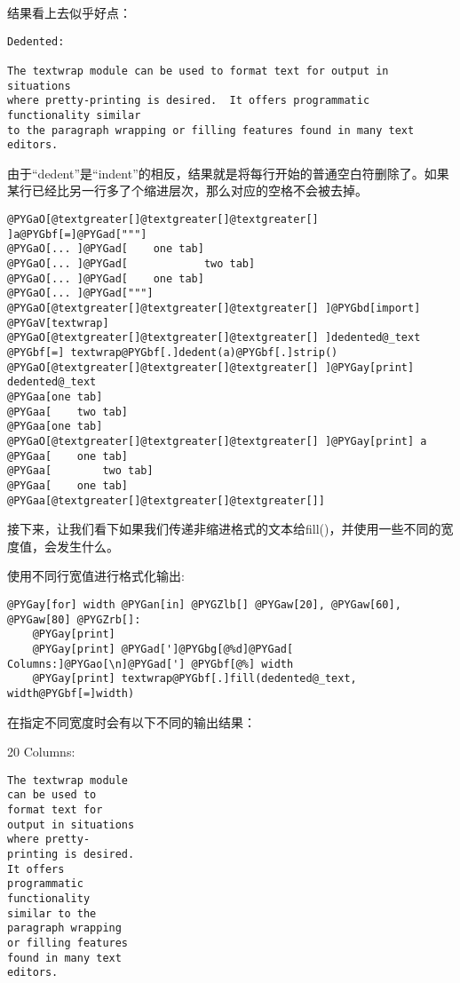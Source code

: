 \documentclass[letterpaper,10pt,english]{manual}
\begin{document}
结果看上去似乎好点：

\begin{Verbatim}[commandchars=@\[\]]
Dedented:

The textwrap module can be used to format text for output in situations
where pretty-printing is desired.  It offers programmatic functionality similar
to the paragraph wrapping or filling features found in many text editors.
\end{Verbatim}

由于“dedent”是“indent”的相反，结果就是将每行开始的普通空白符删除了。如果某行已经比另一行多了个缩进层次，那么对应的空格不会被去掉。

\begin{Verbatim}[commandchars=@\[\]]
@PYGaO[@textgreater[]@textgreater[]@textgreater[] ]a@PYGbf[=]@PYGad["""]
@PYGaO[... ]@PYGad[    one tab]
@PYGaO[... ]@PYGad[            two tab]
@PYGaO[... ]@PYGad[    one tab]
@PYGaO[... ]@PYGad["""]
@PYGaO[@textgreater[]@textgreater[]@textgreater[] ]@PYGbd[import] @PYGaV[textwrap]
@PYGaO[@textgreater[]@textgreater[]@textgreater[] ]dedented@_text @PYGbf[=] textwrap@PYGbf[.]dedent(a)@PYGbf[.]strip()
@PYGaO[@textgreater[]@textgreater[]@textgreater[] ]@PYGay[print] dedented@_text
@PYGaa[one tab]
@PYGaa[    two tab]
@PYGaa[one tab]
@PYGaO[@textgreater[]@textgreater[]@textgreater[] ]@PYGay[print] a
@PYGaa[    one tab]
@PYGaa[        two tab]
@PYGaa[    one tab]
@PYGaa[@textgreater[]@textgreater[]@textgreater[]]
\end{Verbatim}

接下来，让我们看下如果我们传递非缩进格式的文本给fill()，并使用一些不同的宽度值，会发生什么。

使用不同行宽值进行格式化输出:

\begin{Verbatim}[commandchars=@\[\]]
@PYGay[for] width @PYGan[in] @PYGZlb[] @PYGaw[20], @PYGaw[60], @PYGaw[80] @PYGZrb[]:
    @PYGay[print]
    @PYGay[print] @PYGad[']@PYGbg[@%d]@PYGad[ Columns:]@PYGao[\n]@PYGad['] @PYGbf[@%] width
    @PYGay[print] textwrap@PYGbf[.]fill(dedented@_text, width@PYGbf[=]width)
\end{Verbatim}

在指定不同宽度时会有以下不同的输出结果：

20 Columns:

\begin{Verbatim}[commandchars=@\[\]]
The textwrap module
can be used to
format text for
output in situations
where pretty-
printing is desired.
It offers
programmatic
functionality
similar to the
paragraph wrapping
or filling features
found in many text
editors.
\end{Verbatim}
\end{document}
